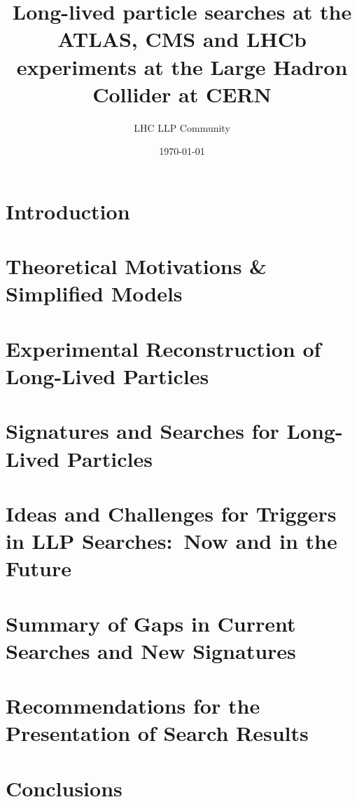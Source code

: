 \documentclass[a4paper,debug,notitlepage,nobib]{tufte-book}
\title{Long-lived particle searches at the ATLAS, CMS and LHCb \\ \smallskip \noindent experiments at the Large Hadron Collider at CERN}
\author{LHC LLP Community}
\date{\today}
\begin{document}
\setcounter{secnumdepth}{3} %



\setcounter{tocdepth}{3}
\tableofcontents
 
\pagebreak

\chapter{Introduction}
\label{sec:Introduction}


\chapter{Theoretical Motivations \& Simplified Models}
\label{sec:theorymotivation}


\chapter{Experimental Reconstruction of Long-Lived Particles}
\label{sec:experimentmotivation}


\chapter{Signatures and Searches for Long-Lived Particles}
\label{sec:signatures}


\chapter{Ideas and Challenges for Triggers in LLP Searches:~Now and in the Future}
\label{sec:triggers}


\chapter{Summary of Gaps in Current Searches and New Signatures}
\label{sec:gaps}


\chapter{Recommendations for the Presentation of Search Results}
\label{sec:recommendations}



\chapter{Conclusions}
\label{sec:conclusions}

 
\end{document}
